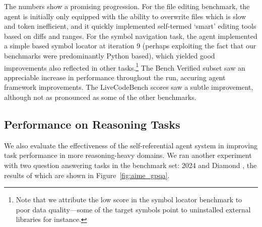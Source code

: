 The numbers show a promising progression. For the file editing benchmark, the
agent is initially only equipped with the ability to overwrite files which is
slow and token inefficient, and it quickly implemented self-termed `smart'
editing tools based on diffs and ranges. For the symbol navigation task, the
agent implemented a simple  based symbol locator at iteration 9
(perhaps exploiting the fact that our benchmarks were predominantly Python
based), which yielded good improvements also reflected in other
tasks.\footnote{Note that we attribute the low score in the symbol locator
  benchmark to poor data quality---some of the target symbols point to
  uninstalled external libraries for instance.} The  Bench Verified
subset saw an appreciable increase in performance throughout the run, accuring
agent framework improvements. The LiveCodeBench scores saw a subtle
improvement, although not as pronounced as some of the other benchmarks.

\subsection{Performance on Reasoning Tasks}%
\label{subsec:reasoning_tasks}

We also evaluate the effectiveness of the self-referential agent system in
improving task performance in more reasoning-heavy domains. We ran another
experiment with two question answering tasks in the benchmark set: 
2024 and  Diamond \cite{reinGPQAGraduateLevelGoogleProof2023}, the
results of which are shown in Figure~\ref{fig:aime_gpqa}.


